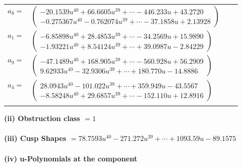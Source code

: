 \documentclass[1p]{elsarticle_modified}
\theoremstyle{definition}
\begin{document}
\begin{tabular}{m{7pt} m{180pt} m{7pt} m{180pt} }
\flushright $a_{8}=$&$\begin{pmatrix}-20.1539 u^{40}+66.6605 u^{39}+\cdots-446.233 u+43.2720\\-0.275367 u^{40}-0.762074 u^{39}+\cdots-37.1858 u+2.13928\end{pmatrix}$ \\
\flushright $a_{1}=$&$\begin{pmatrix}-6.85898 u^{40}+28.4853 u^{39}+\cdots-34.2569 u+15.9890\\-1.93221 u^{40}+8.54124 u^{39}+\cdots+39.0987 u-2.84229\end{pmatrix}$ \\
\flushright $a_{9}=$&$\begin{pmatrix}-47.1489 u^{40}+168.905 u^{39}+\cdots-560.928 u+56.2909\\9.62933 u^{40}-32.9306 u^{39}+\cdots+180.770 u-14.8886\end{pmatrix}$ \\
\flushright $a_{4}=$&$\begin{pmatrix}28.0943 u^{40}-101.022 u^{39}+\cdots+359.949 u-43.5567\\-8.58248 u^{40}+29.6857 u^{39}+\cdots-152.110 u+12.8916\end{pmatrix}$\\&\end{tabular}
\flushleft \textbf{(ii) Obstruction class $= 1$}\\~\\
\flushleft \textbf{(iii) Cusp Shapes $= 78.7593 u^{40}-271.272 u^{39}+\cdots+1093.59 u-89.1575$}\\~\\
\newpage\renewcommand{\arraystretch}{1}
\flushleft \textbf{(iv) u-Polynomials at the component}\newline \\
\end{document}
